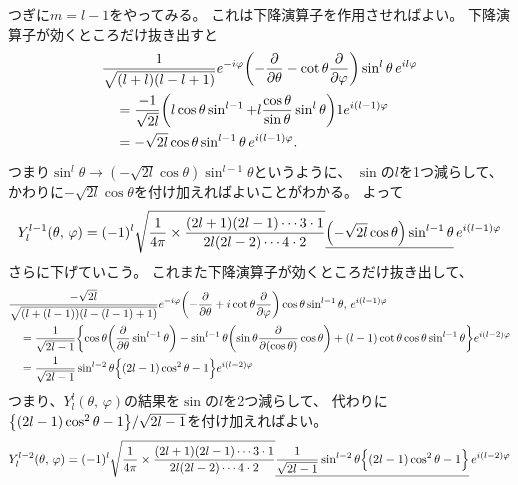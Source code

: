 \documentclass[../../master.tex]{subfiles}
\begin{document}
つぎに\(m=l-1\)をやってみる。
これは下降演算子を作用させればよい。
下降演算子が効くところだけ抜き出すと
\begin{equation}\begin{aligned}[b]
    & \frac{1}{\sqrt{(l+l)(l-l+1)}}e^{-i\varphi}\qty(-\pdv{\theta}-\cot\theta\pdv{\varphi})\sin^l\theta \, e^{il\varphi}\\
	&\quad =\frac{-1}{\sqrt{2l}}\qty(l\cos\theta\sin^{l-1}+l\frac{\cos\theta}{\sin\theta}\sin^l\theta)1e^{i(l-1)\varphi} \\
	&\quad =-\sqrt{2l}\cos\theta\sin^{l-1}\theta\,e^{i(l-1)\varphi}.
\end{aligned}\end{equation}
つまり\(\sin^l\theta\rightarrow(-\sqrt{2l}\cos\theta)\sin^{l-1}\theta\)というように、
\(\sin\)の\(l\)を1つ減らして、かわりに\(-\sqrt{2l}\cos\theta\)を付け加えればよいことがわかる。
よって
\begin{equation}
	Y_{l}^{l-1}(\theta,\,\varphi)=(-1)^l
	\sqrt{\frac{1}{4\pi}\times\frac{(2l+1)(2l-1)\cdots 3\cdot 1}{2l(2l-2) \cdots 4\cdot 2}}
	\underline{\qty(-\sqrt{2l}\cos\theta)\sin^{l-1}\theta} \, e^{i(l-1)\varphi}
\end{equation}
さらに下げていこう。
これまた下降演算子が効くところだけ抜き出して、
\begin{equation}\begin{aligned}[b]
    & \frac{-\sqrt{2l}}{\sqrt{(l+(l-1))(l-(l-1)+1)}}e^{-i\varphi}\qty(-\pdv{\theta} + i\cot\theta\pdv{\varphi})\cos\theta\sin^{l-1}\theta,\,e^{i(l-1)\varphi}  \\
	 & \quad=\frac{1}{\sqrt{2l-1}}
	\qty{\cos\theta\qty(\pdv{\theta}\sin^{l-1}\theta)
	-\sin^{l-1}\theta\qty(\sin\theta\pdv{(\cos\theta)}\cos\theta) + (l-1)\cot\theta\cos\theta\sin^{l-1}\theta}e^{i(l-2)\varphi}                                       \\
	 & \quad=\frac{1}{\sqrt{2l-1}}\sin^{l-2}\theta\Bigr\{(2l-1)\cos^2\theta-1\Bigl\}e^{i(l-2)\varphi}
\end{aligned}\end{equation}
つまり、\(Y_l^l(\theta,\,\varphi)\)の結果を\(\sin\)の\(l\)を2つ減らして、
代わりに\(\qty{(2l-1)\cos^2\theta-1}/\sqrt{2l-1}\)を付け加えればよい。
\begin{equation}
	Y_l^{l-2}(\theta,\,\varphi)
	= (-1)^l\sqrt{\frac{1}{4\pi}\times\frac{(2l+1)(2l-1)\cdots 3\cdot 1}{2l(2l-2) \cdots 4\cdot 2}}
	\underline{\frac{1}{\sqrt{2l-1}}\sin^{l-2}\theta\Bigr\{(2l-1)\cos^2\theta-1\Bigl\}} \, e^{i(l-2)\varphi}
\end{equation}
\end{document}
